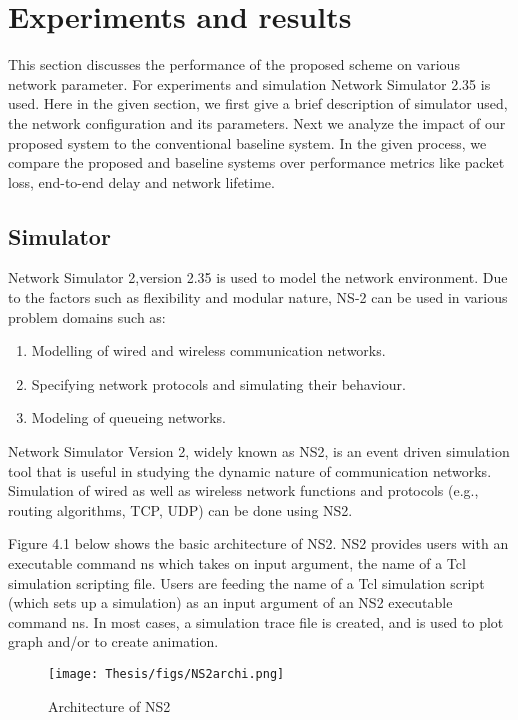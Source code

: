 \chapter{Experiments and results}
This section discusses the performance of the proposed scheme on various network parameter. For experiments and simulation Network Simulator 2.35 is used. Here in the given section, we first give a brief description of simulator used, the network configuration and its parameters. Next we analyze the impact of our proposed system to the conventional baseline system. In the given process, we compare the proposed and baseline systems over performance metrics like packet loss, end-to-end delay and network lifetime.
\section{Simulator}
Network Simulator 2,version 2.35 is used to model the network environment. Due to the factors such as flexibility and modular nature, NS-2 can be used in various problem domains such as:
\begin{enumerate}
    \item Modelling of wired and wireless communication networks.
    \item Specifying network protocols and simulating their behaviour.
    \item Modeling of queueing networks.
\end{enumerate}
Network Simulator Version 2, widely known as NS2, is an event driven simulation tool that is useful in studying the dynamic nature of communication networks. Simulation of wired as well as wireless network functions and protocols (e.g., routing algorithms, TCP, UDP) can be done using NS2. 
\par
 Figure 4.1 below shows the basic architecture of NS2. NS2 provides users with an executable command ns which takes on input argument, the name of a Tcl simulation scripting file. Users are feeding the name of a Tcl simulation script (which sets up a simulation) as an input argument of an NS2 executable command ns. In most cases, a simulation trace file is created, and is used to plot graph and/or to create animation.
 \begin{figure}[h!]
    \centering
    \texttt{[image: Thesis/figs/NS2archi.png]}
    \caption{Architecture of NS2}
    \label{fig:my_label}
\end{figure}
 \par 
